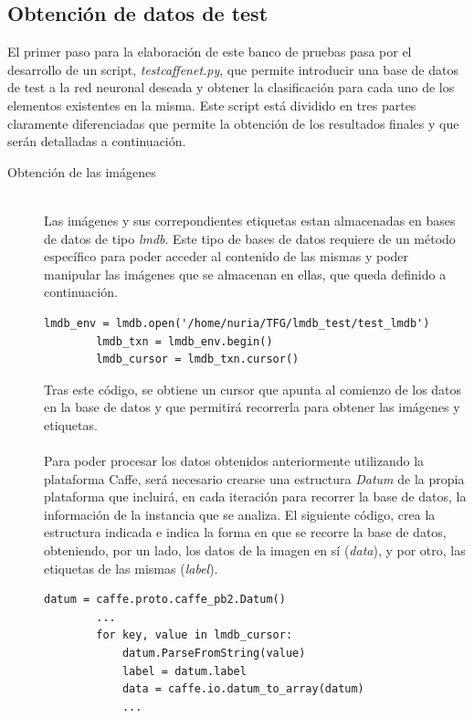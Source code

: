 \subsection{Obtención de datos de test}
El primer paso para la elaboración de este banco de pruebas pasa por el desarrollo de un script, \textit{testcaffenet.py}, que permite introducir una base de datos de test a la red neuronal deseada y obtener la clasificación para cada uno de los elementos existentes en la misma. Este script está dividido en tres partes claramente diferenciadas que permite la obtención de los resultados finales y que serán detalladas a continuación.

\begin{description}
	\item[Obtención de las imágenes] \hfill 
	\vspace{5pt}
	\\
	Las imágenes y sus correpondientes etiquetas estan almacenadas en bases de datos de tipo \textit{lmdb}. Este tipo de bases de datos requiere de un método específico para poder acceder al contenido de las mismas y poder manipular las imágenes que se almacenan en ellas, que queda definido a continuación.
	\vspace{10pt}
	\begin{lstlisting}[frame=single]
		lmdb_env = lmdb.open('/home/nuria/TFG/lmdb_test/test_lmdb')
		lmdb_txn = lmdb_env.begin()
		lmdb_cursor = lmdb_txn.cursor()
	\end{lstlisting}
	
	Tras este código, se obtiene un cursor que apunta al comienzo de los datos en la base de datos y que permitirá recorrerla para obtener las imágenes y etiquetas.\\
	\vspace{-10pt}
	\\
	Para poder procesar los datos obtenidos anteriormente utilizando la plataforma Caffe, será necesario crearse una estructura \textit{Datum} de la propia plataforma que incluirá, en cada iteración para recorrer la base de datos, la información de la instancia que se analiza. El siguiente código, crea la estructura indicada e indica la forma en que se recorre la base de datos, obteniendo, por un lado, los datos de la imagen en sí (\textit{data}), y por otro, las etiquetas de las mismas (\textit{label}).
	\vspace{10pt}
	\begin{lstlisting}[frame=single]
		datum = caffe.proto.caffe_pb2.Datum()
		...
		for key, value in lmdb_cursor:
			datum.ParseFromString(value)
			label = datum.label
			data = caffe.io.datum_to_array(datum)
			...
	\end{lstlisting}
	

\end{description}
